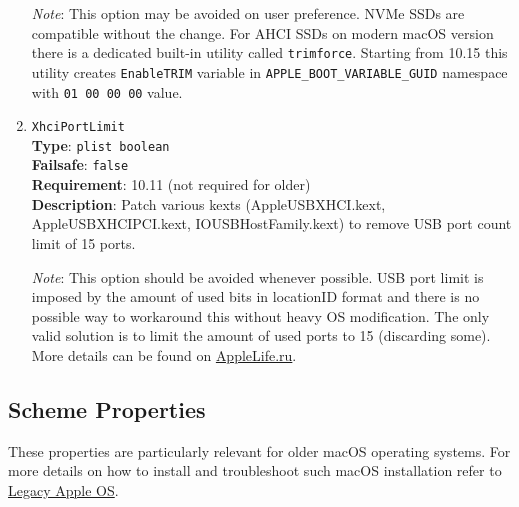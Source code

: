 \documentclass[]{article}
\begin{document}
\begin{enumerate}
  \emph{Note}: This option may be avoided on user preference. NVMe SSDs are
  compatible without the change. For AHCI SSDs on modern macOS version there
  is a dedicated built-in utility called \texttt{trimforce}. Starting from 10.15
  this utility creates \texttt{EnableTRIM} variable in \texttt{APPLE\_BOOT\_VARIABLE\_GUID}
  namespace with \texttt{01 00 00 00} value.

\item
  \texttt{XhciPortLimit}\\
  \textbf{Type}: \texttt{plist\ boolean}\\
  \textbf{Failsafe}: \texttt{false}\\
  \textbf{Requirement}: 10.11 (not required for older)\\
  \textbf{Description}: Patch various kexts (AppleUSBXHCI.kext, AppleUSBXHCIPCI.kext,
  IOUSBHostFamily.kext) to remove USB port count limit of 15 ports.

  \emph{Note}: This option should be avoided whenever possible. USB port limit
  is imposed by the amount of used bits in locationID format and there is no
  possible way to workaround this without heavy OS modification. The only
  valid solution is to limit the amount of used ports to 15 (discarding some).
  More details can be found on \href{https://applelife.ru/posts/550233}{AppleLife.ru}.

\end{enumerate}

\subsection{Scheme Properties}\label{kernelpropsscheme}

These properties are particularly relevant for older macOS operating systems.
For more details on how to install and troubleshoot such macOS installation
refer to \hyperref[legacyapple]{Legacy Apple OS}.
\end{document}
